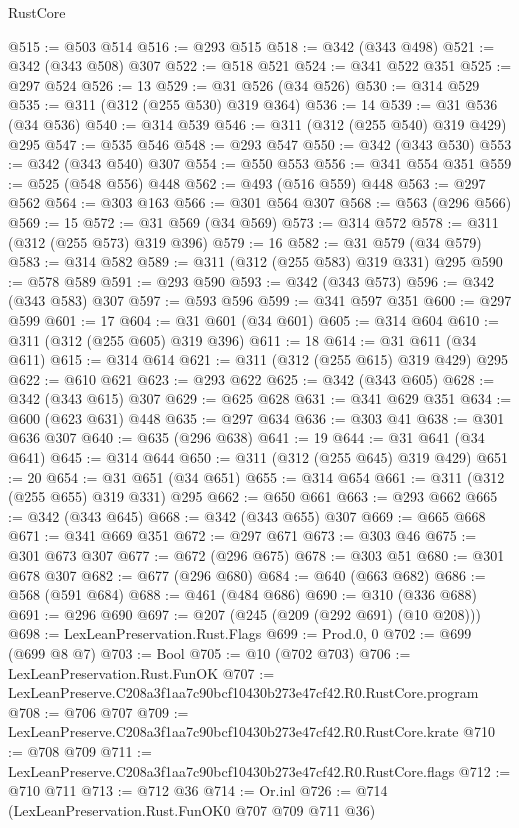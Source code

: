 \begin{lexlean}{RustCore}
\begin{coremodule}
@515 := @503 @514
@516 := @293 @515
@518 := @342 (@343 @498)
@521 := @342 (@343 @508) @307
@522 := @518 @521
@524 := @341 @522 @351
@525 := @297 @524
@526 := 13
@529 := @31 @526 (@34 @526)
@530 := @314 @529
@535 := @311 (@312 (@255 @530) @319 @364)
@536 := 14
@539 := @31 @536 (@34 @536)
@540 := @314 @539
@546 := @311 (@312 (@255 @540) @319 @429) @295
@547 := @535 @546
@548 := @293 @547
@550 := @342 (@343 @530)
@553 := @342 (@343 @540) @307
@554 := @550 @553
@556 := @341 @554 @351
@559 := @525 (@548 @556) @448
@562 := @493 (@516 @559) @448
@563 := @297 @562
@564 := @303 @163
@566 := @301 @564 @307
@568 := @563 (@296 @566)
@569 := 15
@572 := @31 @569 (@34 @569)
@573 := @314 @572
@578 := @311 (@312 (@255 @573) @319 @396)
@579 := 16
@582 := @31 @579 (@34 @579)
@583 := @314 @582
@589 := @311 (@312 (@255 @583) @319 @331) @295
@590 := @578 @589
@591 := @293 @590
@593 := @342 (@343 @573)
@596 := @342 (@343 @583) @307
@597 := @593 @596
@599 := @341 @597 @351
@600 := @297 @599
@601 := 17
@604 := @31 @601 (@34 @601)
@605 := @314 @604
@610 := @311 (@312 (@255 @605) @319 @396)
@611 := 18
@614 := @31 @611 (@34 @611)
@615 := @314 @614
@621 := @311 (@312 (@255 @615) @319 @429) @295
@622 := @610 @621
@623 := @293 @622
@625 := @342 (@343 @605)
@628 := @342 (@343 @615) @307
@629 := @625 @628
@631 := @341 @629 @351
@634 := @600 (@623 @631) @448
@635 := @297 @634
@636 := @303 @41
@638 := @301 @636 @307
@640 := @635 (@296 @638)
@641 := 19
@644 := @31 @641 (@34 @641)
@645 := @314 @644
@650 := @311 (@312 (@255 @645) @319 @429)
@651 := 20
@654 := @31 @651 (@34 @651)
@655 := @314 @654
@661 := @311 (@312 (@255 @655) @319 @331) @295
@662 := @650 @661
@663 := @293 @662
@665 := @342 (@343 @645)
@668 := @342 (@343 @655) @307
@669 := @665 @668
@671 := @341 @669 @351
@672 := @297 @671
@673 := @303 @46
@675 := @301 @673 @307
@677 := @672 (@296 @675)
@678 := @303 @51
@680 := @301 @678 @307
@682 := @677 (@296 @680)
@684 := @640 (@663 @682)
@686 := @568 (@591 @684)
@688 := @461 (@484 @686)
@690 := @310 (@336 @688)
@691 := @296 @690
@697 := @207 (@245 (@209 (@292 @691) (@10 @208)))
@698 := LexLeanPreservation.Rust.Flags
@699 := Prod.{0, 0}
@702 := @699 (@699 @8 @7)
@703 := Bool
@705 := @10 (@702 @703)
@706 := LexLeanPreservation.Rust.FunOK
@707 := LexLeanPreserve.C208a3f1aa7c90bcf10430b273e47cf42.R0.RustCore.program
@708 := @706 @707
@709 := LexLeanPreserve.C208a3f1aa7c90bcf10430b273e47cf42.R0.RustCore.krate
@710 := @708 @709
@711 := LexLeanPreserve.C208a3f1aa7c90bcf10430b273e47cf42.R0.RustCore.flags
@712 := @710 @711
@713 := @712 @36
@714 := Or.inl
@726 := @714
    (LexLeanPreservation.Rust.FunOK0 @707 @709 @711 @36)

\end{coremodule}
\end{lexlean}
